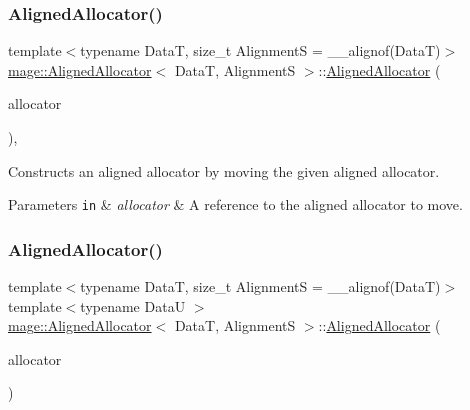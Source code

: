 \subsubsection{\texorpdfstring{Aligned\+Allocator()}{AlignedAllocator()}\hspace{0.1cm}{\footnotesize\ttfamily [3/4]}}
{\footnotesize\ttfamily template$<$typename DataT, size\+\_\+t AlignmentS = \+\_\+\+\_\+alignof(\+Data\+T)$>$ \\
\hyperlink{structmage_1_1_aligned_allocator}{mage\+::\+Aligned\+Allocator}$<$ DataT, AlignmentS $>$\+::\hyperlink{structmage_1_1_aligned_allocator}{Aligned\+Allocator} (\begin{DoxyParamCaption}\item[{\hyperlink{structmage_1_1_aligned_allocator}{Aligned\+Allocator}$<$ DataT, AlignmentS $>$ \&\&}]{allocator }\end{DoxyParamCaption})\hspace{0.3cm}{\ttfamily [default]}, {\ttfamily [noexcept]}}

Constructs an aligned allocator by moving the given aligned allocator.


\begin{DoxyParams}[1]{Parameters}
\mbox{\tt in}  & {\em allocator} & A reference to the aligned allocator to move. \\
\hline
\end{DoxyParams}
\hypertarget{structmage_1_1_aligned_allocator_a728d237ac0ae50bcc593a94f6e4cd4fc}{}\label{structmage_1_1_aligned_allocator_a728d237ac0ae50bcc593a94f6e4cd4fc} 
\subsubsection{\texorpdfstring{Aligned\+Allocator()}{AlignedAllocator()}\hspace{0.1cm}{\footnotesize\ttfamily [4/4]}}
{\footnotesize\ttfamily template$<$typename DataT, size\+\_\+t AlignmentS = \+\_\+\+\_\+alignof(\+Data\+T)$>$ \\
template$<$typename DataU $>$ \\
\hyperlink{structmage_1_1_aligned_allocator}{mage\+::\+Aligned\+Allocator}$<$ DataT, AlignmentS $>$\+::\hyperlink{structmage_1_1_aligned_allocator}{Aligned\+Allocator} (\begin{DoxyParamCaption}\item[{const \hyperlink{structmage_1_1_aligned_allocator}{Aligned\+Allocator}$<$ DataU, AlignmentS $>$ \&}]{allocator }\end{DoxyParamCaption})\hspace{0.3cm}{\ttfamily [noexcept]}}

